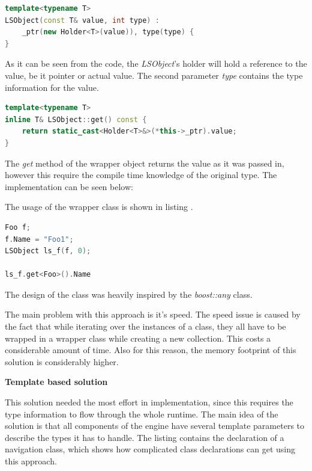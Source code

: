 \begin{lstlisting}[frame=single,float=!ht,language=C++, caption=Constructing a
wrapper object] template<typename T>
LSObject(const T& value, int type) :
	_ptr(new Holder<T>(value)), type(type) {
}
\end{lstlisting}

As it can be seen from the code, the \emph{LSObject}'s holder will hold a
reference to the value, be it pointer or actual value. The second parameter
\emph{type} contains the type information for the value. 

\begin{lstlisting}[frame=single,float=!ht,language=C++, caption=Retrieving
correctly typed object]
template<typename T>
inline T& LSObject::get() const {
    return static_cast<Holder<T>&>(*this->_ptr).value;
}
\end{lstlisting}


The \emph{get} method of the wrapper object returns the value as it was passed
in, however this require the compile time knowledge of the original type. The
implementation can be seen below:

The usage of the wrapper class is shown in listing .

\begin{lstlisting}[frame=single,float=!ht,language=C++,
label=listing:wrapper_usage, caption=Wrapper object usage]
Foo f;
f.Name = "Foo1";
LSObject ls_f(f, 0);

ls_f.get<Foo>().Name
\end{lstlisting}

The design of the class was heavily inspired by the \emph{boost::any} class.

The main problem with this approach is it's speed. The speed issue is caused by
the fact that while iterating over the instances of a class, they all have to be
wrapped in a wrapper class while creating a new collection. This costs a
considerable amount of time. Also for this reason, the memory footprint of this
solution is considerably higher.

\textbf{Template based solution}

This solution needed the most effort in implementation, since this requires
the type information to flow through the whole runtime. The main idea of the
solution is that all components of the engine have several template parameters
to describe the types it has to handle. The listing 
contains the declaration of a navigation class, which shows how complicated
class declarations can get using this approach.

